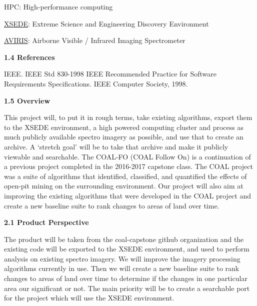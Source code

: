 \documentclass[a4paper,12pt]{article}
\begin{document}
\noindent HPC: High-performance computing\newline


\noindent \href{https://www.xsede.org/}{XSEDE}: Extreme Science and Engineering Discovery Environment\newline


\noindent \href{https://aviris.jpl.nasa.gov/}{AVIRIS}: Airborne Visible / Infrared Imaging Spectrometer\newline


\noindent \textbf{1.4 References}\newline

IEEE. IEEE Std 830-1998 IEEE Recommended Practice for Software Requirements Specifications. IEEE Computer Society, 1998.\newline


\noindent \textbf{1.5 Overview}\newline


\noindent This project will, to put it in rough terms, take existing algorithms, export them to the XSEDE environment, a high powered computing cluster and process as much publicly available spectro imagery as possible, and use that to create an archive. A ‘stretch goal’ will be to take that archive and make it publicly viewable and searchable. The COAL-FO (COAL Follow On) is a continuation of a previous project completed in the 2016-2017 capstone class. The COAL project was a suite of algorithms that identified, classified, and quantified the effects of open-pit mining on the surrounding environment. Our project will also aim at improving the existing algorithms that were developed in the COAL project and create a new baseline suite to rank changes to areas of land over time. \newline


\newline


\noindent \textbf{2.1 Product Perspective}\newline


\noindent The product will be taken from the coal-capstone github organization and the existing code will be exported to the XSEDE environment, and used to perform analysis on existing spectro imagery. We will improve the imagery processing algorithms currently in use. Then we will create a new baseline suite to rank changes to areas of land over time to determine if the changes in one particular area our significant or not. The main priority will be to create a searchable port for the project which will use the XSEDE environment. \newline
\end{document}
